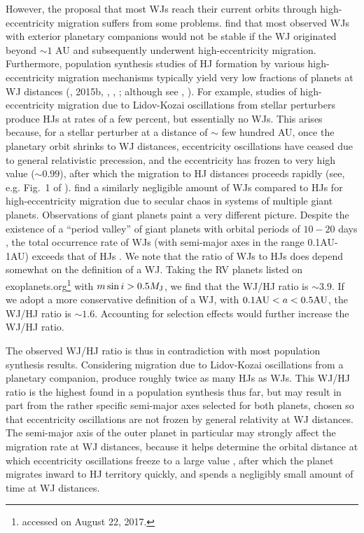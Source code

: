 \documentclass[12pt,useAMS, usenatbib]{mn2e}
\newcommand{\mjup}{M_{\rm J}}
\begin{document}
However, the proposal that most WJs reach their current orbits through high-eccentricity migration suffers from some problems.  \cite{antonini2016} find that most observed WJs with exterior planetary companions would not be stable if the WJ originated beyond $\sim 1$ AU and subsequently underwent high-eccentricity migration.  Furthermore, population synthesis studies of HJ formation by various high-eccentricity migration mechanisms typically yield very low fractions of planets at WJ distances (\citealt{petrovich2015}, 2015b, \citealt{kra2016}, \citealt{hamers2017}, \citealt{hamers2017b}; although see \citealt{dawson2014}, \citealt{petrovich2016}).  For example, studies of high-eccentricity migration due to Lidov-Kozai oscillations from stellar perturbers \citep{petrovich2015, kra2016} produce HJs at rates of a few percent, but essentially no WJs.  This arises because, for a stellar perturber at a distance of $\sim$ few hundred AU, once the planetary orbit shrinks to WJ distances, eccentricity oscillations have ceased due to general relativistic precession, and the eccentricity has frozen to very high value ($\sim 0.99$), after which the migration to HJ distances proceeds rapidly (see, e.g. Fig.~1 of \citealt{kra2016}).  \cite{hamers2017} find a similarly negligible amount of WJs compared to HJs for high-eccentricity migration due to secular chaos in systems of multiple giant planets.  Observations of giant planets paint a very different picture. Despite the existence of a ``period valley'' of giant planets with orbital periods of $10-20 $ days \citep[e.g.][]{udry2003, jones2003, santerne2016}, the total occurrence rate of WJs (with semi-major axes in the range 0.1AU-1AU) exceeds that of HJs \citep[$a<0.1$ AU  see][Fig.~8]{santerne2016}. We note that the ratio of WJs to HJs does depend somewhat on the definition of a WJ.  Taking the RV planets listed on exoplanets.org\footnote{accessed on August 22, 2017.} with $m \sin i > 0.5 \mjup$, we find that the WJ/HJ ratio is $\sim 3.9$.   If we adopt a more conservative definition of a WJ, with $0.1  {\rm AU} < a < 0.5  {\rm AU}$, the WJ/HJ ratio is $\sim 1.6$.  Accounting for selection effects would further increase the WJ/HJ ratio.

The observed WJ/HJ ratio is thus in contradiction with most population synthesis results.  Considering migration due to Lidov-Kozai oscillations from a planetary companion, \cite{petrovich2016} produce roughly twice as many HJs as WJs.  This WJ/HJ ratio is the highest found in a population synthesis thus far,  but may result in part from the rather specific semi-major axes selected for both planets, chosen so that eccentricity oscillations are not frozen by general relativity at WJ distances.  The semi-major axis of the outer planet in particular may strongly affect the migration rate at WJ distances, because it helps determine the orbital distance at which eccentricity oscillations freeze to a large value \citep[see][Section 3.1]{kra2016}, after which the planet migrates inward to HJ territory quickly, and spends a negligibly small amount of time at WJ distances.
\end{document}

